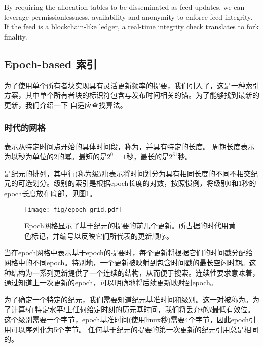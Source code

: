 By requiring the allocation tables to be disseminated as feed updates, we can leverage permissionlessness, availability and anonymity to enforce feed integrity. If the feed is a blockchain-like ledger, a real-time integrity check translates to fork finality. 


\subsection{Epoch-based
索引\statusyellow}\label{sec:epoch-based-feeds}

\yellow{}

为了使用单个所有者块实现具有灵活更新频率的提要，我们引入了，这是一种索引方案，其中单个所有者块的标识符包含与发布时间相关的锚。为了能够找到最新的更新，我们介绍一下
自适应查找算法。 

\subsubsection{时代的网格}

表示从特定时间点开始的具体时间段，称为，并具有特定的长度。
周期长度表示为以秒为单位的2的幂。最短的是$2^0 = 1$秒，最长的是$2^{31}$秒。

是纪元的排列，其中行(称为级别)表示将时间划分为具有相同长度的不同不相交纪元的可选划分。级别的索引是根据epoch长度的对数，按照惯例，将级别0和1秒的epoch长度放在底部，见图\ref{fig:epoch-grid}。

\begin{figure}[htbp]
\centering
\texttt{[image: fig/epoch-grid.pdf]}
\caption[Epoch网格与基于纪元的feed updates\statusorange]{Epoch网格显示了基于纪元的提要的前几个更新。所占据的时代用黄色标记，并编号以反映它们所代表的更新顺序。 }
\label{fig:epoch-grid}
\end{figure}

当在epoch网格中表示基于epoch的提要时，每个更新将根据它们的时间戳分配给网格中的不同epoch。特别地，一个更新被映射到包含时间戳的最长空闲时期。这种结构为一系列更新提供了一个连续的结构，从而便于搜索。连续性要求意味着，通过知道上一次更新的epoch，可以明确地将后续更新映射到epoch。


为了确定一个特定的纪元，我们需要知道纪元基准时间和级别。这一对被称为。为了计算$t$在特定水平$l$上任何给定时刻的历元基时间，我们将丢弃$t$的$l$最低有效位。
这个级别需要一个字节，epoch基准时间(使用linux秒)需要4个字节，因此epoch引用可以序列化为5个字节。
任何基于纪元的提要的第一次更新的纪元引用总是相同的。

